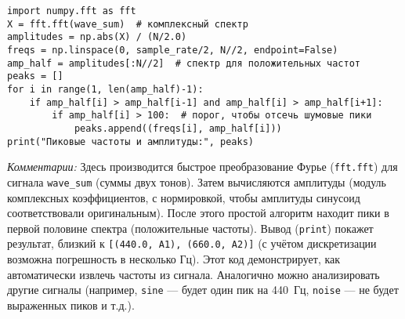 \documentclass[bachelor, och, diploma]{SCWorks}
\begin{document}
\begin{verbatim}
import numpy.fft as fft
X = fft.fft(wave_sum)  # комплексный спектр
amplitudes = np.abs(X) / (N/2.0)
freqs = np.linspace(0, sample_rate/2, N//2, endpoint=False)
amp_half = amplitudes[:N//2]  # спектр для положительных частот
peaks = []
for i in range(1, len(amp_half)-1):
    if amp_half[i] > amp_half[i-1] and amp_half[i] > amp_half[i+1]:
        if amp_half[i] > 100:  # порог, чтобы отсечь шумовые пики
            peaks.append((freqs[i], amp_half[i]))
print("Пиковые частоты и амплитуды:", peaks)
\end{verbatim}
\textit{Комментарии:} Здесь производится быстрое преобразование Фурье (\texttt{fft.fft}) для сигнала \texttt{wave\_sum} (суммы двух тонов). Затем вычисляются амплитуды (модуль комплексных коэффициентов, с нормировкой, чтобы амплитуды синусоид соответствовали оригинальным). После этого простой алгоритм находит пики в первой половине спектра (положительные частоты). Вывод (\texttt{print}) покажет результат, близкий к \texttt{[(440.0, A1), (660.0, A2)]} (с учётом дискретизации возможна погрешность в несколько Гц). Этот код демонстрирует, как автоматически извлечь частоты из сигнала. Аналогично можно анализировать другие сигналы (например, \texttt{sine} — будет один пик на 440~Гц, \texttt{noise} — не будет выраженных пиков и т.д.).
\end{document}
